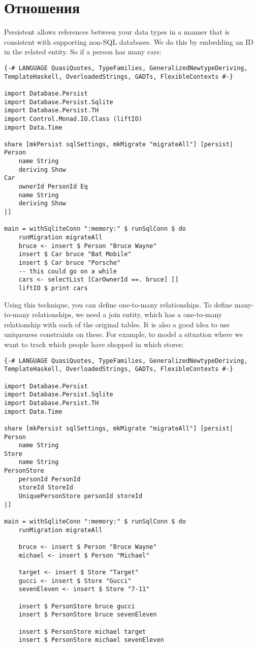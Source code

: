 \section{Отношения} %

Persistent allows references between your data types in a manner that is consistent with supporting non-SQL databases. We do this by embedding an ID in the related entity. So if a person has many cars:

\begin{lstlisting}
{-# LANGUAGE QuasiQuotes, TypeFamilies, GeneralizedNewtypeDeriving, TemplateHaskell, OverloadedStrings, GADTs, FlexibleContexts #-}

import Database.Persist
import Database.Persist.Sqlite
import Database.Persist.TH
import Control.Monad.IO.Class (liftIO)
import Data.Time

share [mkPersist sqlSettings, mkMigrate "migrateAll"] [persist|
Person
    name String
    deriving Show
Car
    ownerId PersonId Eq
    name String
    deriving Show
|]

main = withSqliteConn ":memory:" $ runSqlConn $ do
    runMigration migrateAll
    bruce <- insert $ Person "Bruce Wayne"
    insert $ Car bruce "Bat Mobile"
    insert $ Car bruce "Porsche"
    -- this could go on a while
    cars <- selectList [CarOwnerId ==. bruce] []
    liftIO $ print cars
\end{lstlisting}%
 
Using this technique, you can define one-to-many relationships. To define many-to-many relationships, we need a join entity, which has a one-to-many relationship with each of the original tables. It is also a good idea to use uniqueness constraints on these. For example, to model a situation where we want to track which people have shopped in which stores:

\begin{lstlisting}
{-# LANGUAGE QuasiQuotes, TypeFamilies, GeneralizedNewtypeDeriving, TemplateHaskell, OverloadedStrings, GADTs, FlexibleContexts #-}

import Database.Persist
import Database.Persist.Sqlite
import Database.Persist.TH
import Data.Time

share [mkPersist sqlSettings, mkMigrate "migrateAll"] [persist|
Person
    name String
Store
    name String
PersonStore
    personId PersonId
    storeId StoreId
    UniquePersonStore personId storeId
|]

main = withSqliteConn ":memory:" $ runSqlConn $ do
    runMigration migrateAll

    bruce <- insert $ Person "Bruce Wayne"
    michael <- insert $ Person "Michael"

    target <- insert $ Store "Target"
    gucci <- insert $ Store "Gucci"
    sevenEleven <- insert $ Store "7-11"

    insert $ PersonStore bruce gucci
    insert $ PersonStore bruce sevenEleven

    insert $ PersonStore michael target
    insert $ PersonStore michael sevenEleven
\end{lstlisting}%

